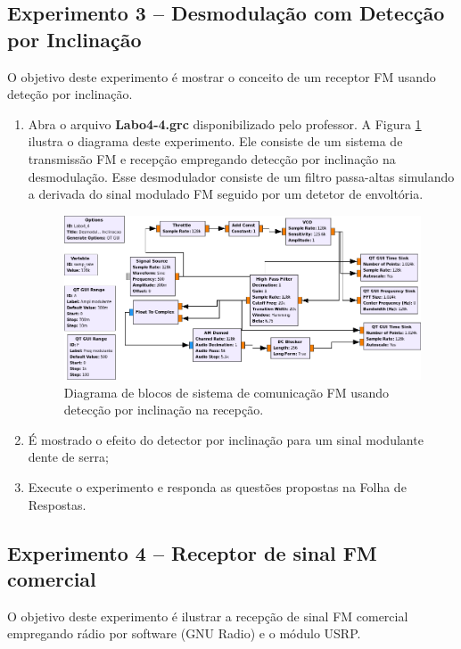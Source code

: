 \documentclass[12pt,addpoints]{exam}
\begin{document}
\subsection{Experimento 3 -- Desmodulação com Detecção por Inclinação}

O objetivo deste experimento é mostrar o conceito de um receptor FM usando deteção por inclinação.

\begin{enumerate}
    \item  Abra o arquivo \textbf{Labo4-4.grc} disponibilizado pelo professor. A Figura \ref{fig:GRC_4-4} ilustra o diagrama deste experimento. Ele consiste de um sistema de transmissão FM e recepção empregando detecção por inclinação na desmodulação. Esse desmodulador consiste de um filtro passa-altas simulando a derivada do sinal modulado FM seguido por um detetor de envoltória.
    \begin{figure}[htb]
        \centering
        \includegraphics[scale=.5]{./Figuras/Labo4-4}
        \caption{Diagrama de blocos de sistema de comunicação FM usando detecção por inclinação na recepção.} 
        \label{fig:GRC_4-4}
    \end{figure}
  \item É mostrado o efeito do detector por inclinação para um sinal modulante dente de serra;
  \item Execute o experimento e responda as questões propostas na Folha de Respostas.
\end{enumerate}

\subsection{Experimento 4 -- Receptor de sinal FM comercial}

O objetivo deste experimento é ilustrar a recepção de sinal FM comercial empregando rádio por software (GNU Radio) e o módulo USRP.
\end{document}
